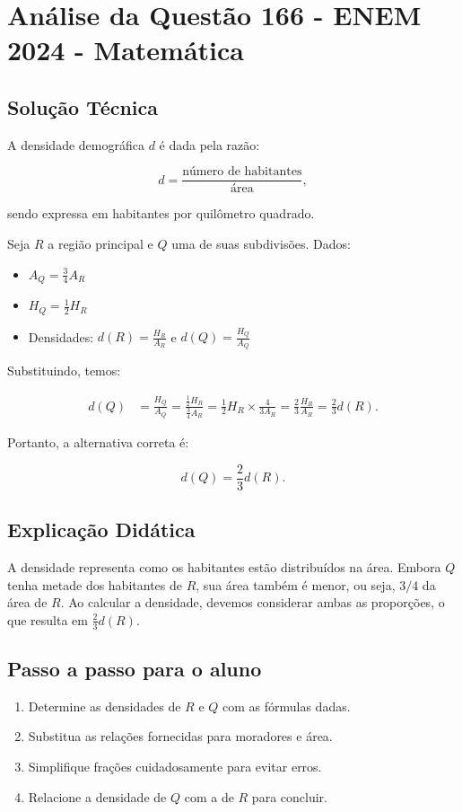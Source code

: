 \documentclass{article}
\begin{document}
\section*{Análise da Questão 166 - ENEM 2024 - Matemática}

\subsection*{Solução Técnica}

A densidade demográfica $d$ é dada pela razão:

\[
d = \frac{\text{número de habitantes}}{\text{área}},
\]

sendo expressa em habitantes por quilômetro quadrado.

Seja $R$ a região principal e $Q$ uma de suas subdivisões. Dados:
\begin{itemize}
  \item $A_Q = \frac{3}{4} A_R$
  \item $H_Q = \frac{1}{2} H_R$
  \item Densidades: $d(R) = \frac{H_R}{A_R}$ e $d(Q) = \frac{H_Q}{A_Q}$
\end{itemize}

Substituindo, temos:

\[
\begin{aligned}
  d(Q) &= \frac{H_Q}{A_Q} = \frac{\frac{1}{2} H_R}{\frac{3}{4} A_R} = \frac{1}{2} H_R \times \frac{4}{3 A_R} = \frac{2}{3} \frac{H_R}{A_R} = \frac{2}{3} d(R).
\end{aligned}
\]

Portanto, a alternativa correta é:

\[
d(Q) = \frac{2}{3} d(R).
\]

\subsection*{Explicação Didática}

A densidade representa como os habitantes estão distribuídos na área. Embora $Q$ tenha metade dos habitantes de $R$, sua área também é menor, ou seja, $3/4$ da área de $R$. Ao calcular a densidade, devemos considerar ambas as proporções, o que resulta em $\frac{2}{3} d(R)$.

\subsection*{Passo a passo para o aluno}
\begin{enumerate}
  \item Determine as densidades de $R$ e $Q$ com as fórmulas dadas.
  \item Substitua as relações fornecidas para moradores e área.
  \item Simplifique frações cuidadosamente para evitar erros.
  \item Relacione a densidade de $Q$ com a de $R$ para concluir.
\end{enumerate}
\end{document}
